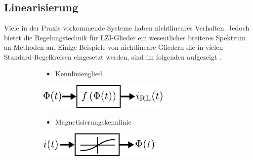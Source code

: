 \subsection{Linearisierung}
%
Viele in der Praxis vorkommende Systeme haben nichtlineares Verhalten. Jedoch bietet die Regelungstechnik für LZI-Glieder ein wesentliches breiteres Spektrum an Methoden an. Einige Beispiele von nichtlineare Gliedern die in vielen Standard-Regelkreisen eingesetzt werden, sind im folgenden aufgezeigt \cite{Foellinger94,Landes00}.
%
\begin{figure}[h]
%
	\begin{subfigure}[c]{\textwidth}
		\begin{minipage}{0.5\textwidth}
			\begin{itemize}
				\item Kennlinienglied
			\end{itemize}
		\end{minipage}\hfill
		\begin{minipage}{0.5\textwidth}
			\centering
			\includegraphics[width=0.7\textwidth]{Abbildungen/Modellbildung/PDF/Kennlinienglied.pdf}
		\end{minipage}
	\end{subfigure}
	\vspace{1cm}
	\begin{subfigure}[c]{\textwidth}
		\begin{minipage}{0.5\textwidth}
			\begin{itemize}
				\item Magnetisierungskennlinie
			\end{itemize}
		\end{minipage}\hfill
		\begin{minipage}{0.5\textwidth}
			\centering
			\includegraphics[width=0.65\textwidth]{Abbildungen/Modellbildung/PDF/Magnetisierungskurve.pdf}
		\end{minipage}
	\end{subfigure}
	\vspace{1cm}

\end{figure}
